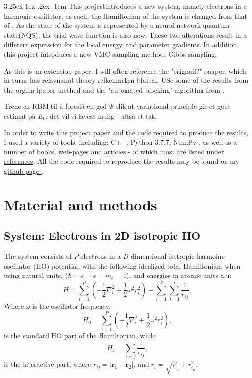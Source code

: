 \documentclass[%
oneside,                 %
final,                   %
10pt]{article}
\makeatletter
\renewcommand\paragraph{\@startsection{paragraph}{5}{\z@}%
  {3.25ex \@plus1ex \@minus.2ex}%
  {-1em}%
  {\normalfont\normalsize\bfseries}}
\makeatother
\begin{document}
\paragraph{This project}introduces a new system, namely electrons in a harmonic oscillator, as such, the Hamiltonian of the system is changed from that of \cite{JN_P1}. As the state of the system is represented by a neural network quantum state(NQS), the trial wave function is also new. These two alterations result in a different expression for the local energy, and parameter gradients. In addition, this project introduces a new VMC sampling method, Gibbs sampling. 

As this is an extention paper, I will often reference the "orignail?" paaper, which in turns has relavnanat theory refkenmrken blalbal. USe some of the results from the orgina lpaper
method and the "automated blocking" algorithm from \citep{Jonsson}.

 Trene en RBM til å foreslå en god $\Psi$ slik at variational principle gir et godt estimat på $E_0$, det vil si lavest mulig - altså et tak. 
 
In order to write this project paper and the code required to produce the results, I used a variety of tools, including: C++, Python 3.7.7, NumPy \cite{numpy}, as well as a number of books, web-pages and articles - of which most are listed under 
 \hyperref[refer]{references}. All the code required to reproduce the results may be found on my \href{https://github.com/johanere/FYS4411}{github page }.  
\section{Material and methods} \label{theory}


\subsection{System: Electrons in 2D isotropic HO}
The system consists of $P$ electrons in a $D$ dimensional isotropic harmoinc oscillator (HO) potential, with the following idealized total Hamiltonian, when using natural units, ($\hbar=c=e=m_e=1$), and energies in  atomic units a.u:
\begin{equation}
\label{eq:finalH}
H=\sum_{i=1}^{P} \left(  -\frac{1}{2} \nabla_i^2 + \frac{1}{2} \omega^2r_i^2  \right)+\sum_{i=1}^P \sum_{j=1}^i \frac{1}{r_{ij}},
\end{equation}
Where $\omega$ is the oscillator frequency. 
\begin{equation*}
H_0=\sum_{i=1}^{P} \left(  -\frac{1}{2} \nabla_i^2 + \frac{1}{2} \omega^2r_i^2  \right),
\end{equation*}
is the standard HO part of the Hamiltonian, while
\begin{equation*}
H_1=\sum_{i<j}\frac{1}{r_{ij}},
\end{equation*}
is the interactive part, where $r_{ij}=\vert \bm{r}_1-\bm{r}_2\vert$, and $r_i = \sqrt{r_{i_x}^2+r_{i_y}^2}$.
\end{document}
